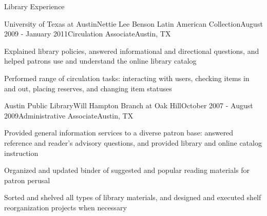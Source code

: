 \documentclass{resume} %
\begin{document}
\begin{rSection}{Library Experience}

\begin{rSubsection}{University of Texas at Austin}{Nettie Lee Benson Latin American Collection}{August 2009 - January 2011}{Circulation Associate}{Austin, TX}
\item Explained library policies, answered informational and directional questions, and helped patrons use and understand the online library catalog
\item Performed range of circulation tasks: interacting with users, checking items in and out, placing reserves, and changing item statuses
\end{rSubsection}

\pagebreak

\begin{rSubsection}{Austin Public Library}{Will Hampton Branch at Oak Hill}{October 2007 - August 2009}{Administrative Associate}{Austin, TX}
\item Provided general information services to a diverse patron base: answered reference and reader’s advisory questions, and provided library and online catalog instruction
\item Organized and updated binder of suggested and popular reading materials for patron perusal
\item Sorted and shelved all types of library materials, and designed and executed shelf reorganization projects when necessary
\end{rSubsection}



\end{rSection}

\pagebreak
\end{document}
